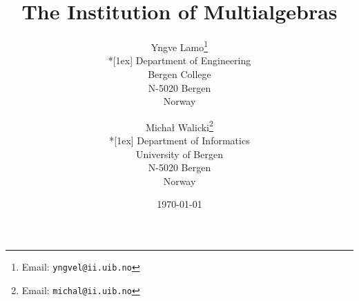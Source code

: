 \documentclass[12pt]{IIreport}
\begin{document}

\title{The Institution of Multialgebras} 
\author{Yngve Lamo\thanks{Email: \texttt{yngvel@ii.uib.no}} \\*[1ex] Department of
Engineering \\ Bergen College \\  N-5020 Bergen \\ Norway
\and Micha{\l} Walicki\thanks{Email: \texttt{michal@ii.uib.no}} \\*[1ex] Department of
  Informatics \\ University of Bergen \\ N-5020 Bergen \\ Norway}


\date{\today}
\maketitle






\end{document}
